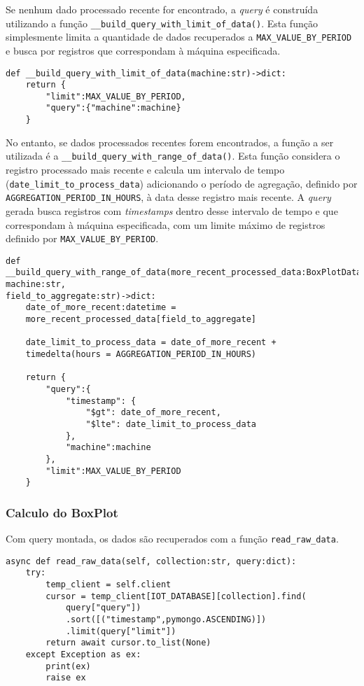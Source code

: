 Se nenhum dado processado recente for encontrado, a \textit{query} é construída utilizando a função \texttt{\_\_build\_query\_with\_limit\_of\_data()}. Esta função simplesmente limita a quantidade de dados recuperados a \texttt{MAX\_VALUE\_BY\_PERIOD} e busca por registros que correspondam à máquina especificada.

\begin{verbatim}
def __build_query_with_limit_of_data(machine:str)->dict:
    return {
        "limit":MAX_VALUE_BY_PERIOD,
        "query":{"machine":machine}
    }
\end{verbatim}


No entanto, se dados processados recentes forem encontrados, a função a ser utilizada é a \texttt{\_\_build\_query\_with\_range\_of\_data()}. Esta função considera o registro processado mais recente e calcula um intervalo de tempo (\texttt{date\_limit\_to\_process\_data}) adicionando o período de agregação, definido por \texttt{AGGREGATION\_PERIOD\_IN\_HOURS}, à data desse registro mais recente. A \textit{query} gerada busca registros com \textit{timestamps} dentro desse intervalo de tempo e que correspondam à máquina especificada, com um limite máximo de 
registros definido por \texttt{MAX\_VALUE\_BY\_PERIOD}.

\begin{verbatim}
def __build_query_with_range_of_data(more_recent_processed_data:BoxPlotData,
machine:str,
field_to_aggregate:str)->dict:
    date_of_more_recent:datetime = 
    more_recent_processed_data[field_to_aggregate]

    date_limit_to_process_data = date_of_more_recent + 
    timedelta(hours = AGGREGATION_PERIOD_IN_HOURS)

    return {
        "query":{
            "timestamp": {
                "$gt": date_of_more_recent,
                "$lte": date_limit_to_process_data
            },
            "machine":machine
        },
        "limit":MAX_VALUE_BY_PERIOD
    }

\end{verbatim}

\subsubsection{Calculo do BoxPlot}
Com query montada, os dados são recuperados com a função \texttt{read\_raw\_data}.

\begin{verbatim}
async def read_raw_data(self, collection:str, query:dict):
    try:
        temp_client = self.client
        cursor = temp_client[IOT_DATABASE][collection].find(
            query["query"])
            .sort([("timestamp",pymongo.ASCENDING)])
            .limit(query["limit"])
        return await cursor.to_list(None)
    except Exception as ex:
        print(ex)
        raise ex
\end{verbatim}

